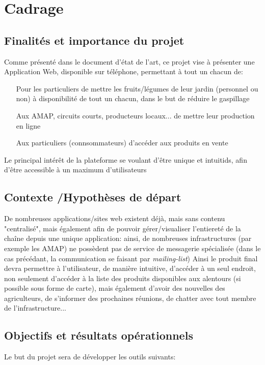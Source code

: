 \chapter*{Cadrage}

\section{Finalités et importance du projet}
Comme présenté dans le document d'état de l'art, ce projet vise à présenter une Application Web, disponible sur téléphone, permettant à tout un chacun de:
\begin{itemize}
	\item[Pour les particuliers] de mettre les fruits/légumes de leur jardin (personnel ou non) à disponibilité de tout un chacun, dans le but de réduire le gaspillage
	\item[Aux AMAP, circuits courts, producteurs locaux...] de mettre leur production en ligne
	\item[Aux particuliers] (connsommateurs) d'accéder aux produits en vente
\end{itemize}

Le principal intérêt de la plateforme se voulant d'être unique et intuitids, afin d'être accessible à un maximum d'utilisateurs

\section{Contexte /Hypothèses de départ}
De nombreuses applications/sites web existent déjà, mais sans contenu "centralisé", mais également afin de pouvoir gérer/visualiser l'entiereté de la chaîne depuis une unique application: ainsi, de nombreuses infrastructures (par exemple les AMAP) ne possèdent pas de service de messagerie spécialisée (dans le cas précédant, la communication se faisant par \textit{mailing-list})
Ainsi le produit final devra permettre à l'utilisateur, de manière intuitive, d'accéder à un seul endroit, non seulement d'accéder à la liste des produits disponibles aux alentours (si possible sous forme de carte), mais également d'avoir des nouvelles des agriculteurs, de s'informer des prochaines réunions, de chatter avec tout membre de l'infrastructure...

\section{Objectifs et résultats opérationnels}
Le but du projet sera de développer les outils suivants:


